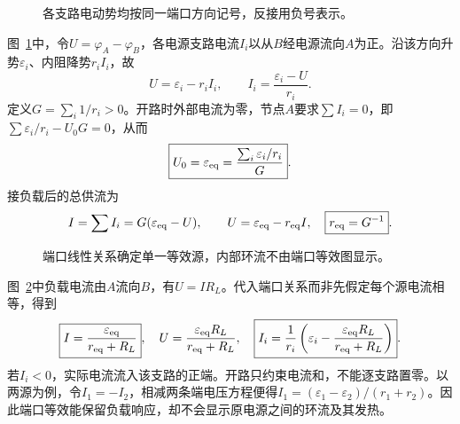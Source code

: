 \begin{figure}[H]\centering
{}
\caption{各支路电动势均按同一端口方向记号，反接用负号表示。}\label{fig:c1-parallel-source-q}
\end{figure}
\begin{solution}
图~\ref{fig:c1-parallel-source-q}中，令$U=\varphi_A-\varphi_B$，各电源支路电流$I_i$以从$B$经电源流向$A$为正。沿该方向升势$\varepsilon_i$、内阻降势$r_iI_i$，故
\[
 U=\varepsilon_i-r_iI_i,\qquad I_i=\frac{\varepsilon_i-U}{r_i}.
\]
定义$G=\sum_i1/r_i>0$。开路时外部电流为零，节点$A$要求$\sum I_i=0$，即$\sum\varepsilon_i/r_i-U_0G=0$，从而
\[
 \boxed{U_0=\varepsilon_{\rm eq}=\frac{\sum_i\varepsilon_i/r_i}{G}}.
\]
接负载后的总供流为
\[
 I=\sum I_i=G(\varepsilon_{\rm eq}-U),\qquad
 U=\varepsilon_{\rm eq}-r_{\rm eq}I,\quad
 \boxed{r_{\rm eq}=G^{-1}}.
\]
\begin{figure}[H]\centering
{}
\caption{端口线性关系确定单一等效源，内部环流不由端口等效图显示。}\label{fig:c1-parallel-source-s}
\end{figure}
图~\ref{fig:c1-parallel-source-s}中负载电流由$A$流向$B$，有$U=IR_L$。代入端口关系而非先假定每个源电流相等，得到
\[
 \boxed{I=\frac{\varepsilon_{\rm eq}}{r_{\rm eq}+R_L}},\quad
 U=\frac{\varepsilon_{\rm eq}R_L}{r_{\rm eq}+R_L},\quad
 \boxed{I_i=\frac1{r_i}\left(\varepsilon_i-
 \frac{\varepsilon_{\rm eq}R_L}{r_{\rm eq}+R_L}\right)}.
\]
若$I_i<0$，实际电流流入该支路的正端。开路只约束电流和，不能逐支路置零。以两源为例，令$I_1=-I_2$，相减两条端电压方程便得$I_1=(\varepsilon_1-\varepsilon_2)/(r_1+r_2)$。因此端口等效能保留负载响应，却不会显示原电源之间的环流及其发热。
\end{solution}





